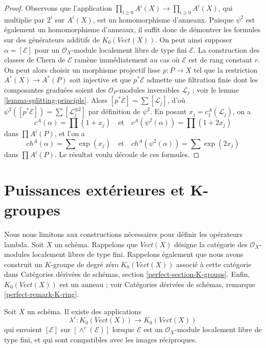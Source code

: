 \begin{proof}
Observons que l'application $\prod_{i \geq 0} A^i(X) \to \prod_{i \geq 0} A^i(X)$,
qui multiplie par $2^i$ sur $A^i(X)$, est un homomorphisme d'anneaux. Puisque $\psi^2$
est également un homomorphisme d'anneaux, il suffit donc de démontrer les formules
sur des générateurs additifs de $K_0(\textit{Vect}(X))$. On peut ainsi supposer $\alpha = [\mathcal{E}]$
pour un $\mathcal{O}_X$-module localement libre de type fini $\mathcal{E}$.
La construction des classes de Chern de $\mathcal{E}$ ramène immédiatement
au cas où $\mathcal{E}$ est de rang constant $r$.
On peut alors choisir un morphisme projectif lisse $p : P \to X$
tel que la restriction $A^*(X) \to A^*(P)$ soit injective
et que $p^*\mathcal{E}$ admette une filtration finie dont
les composantes graduées soient des $\mathcal{O}_P$-modules inversibles $\mathcal{L}_j$ ; voir
le lemme \ref{lemma-splitting-principle}. Alors
$[p^*\mathcal{E}] = \sum [\mathcal{L}_j]$, d'où
$\psi^2([p^*\mathcal{E}]) = \sum [\mathcal{L}_j^{\otimes 2}]$
par définition de $\psi^2$. En posant $x_j  = c^A_1(\mathcal{L}_j)$,
on a
$$
c^A(\alpha) = \prod (1 + x_j)
\quad\text{et}\quad
c^A(\psi^2(\alpha)) = \prod (1 + 2 x_j)
$$
dans $\prod A^i(P)$, et l'on a
$$
ch^A(\alpha) = \sum \exp(x_j)
\quad\text{et}\quad
ch^A(\psi^2(\alpha)) = \sum \exp(2 x_j)
$$
dans $\prod A^i(P)$. Le résultat voulu découle de ces formules.
\end{proof}







\section{Puissances extérieures et K-groupes}
\label{section-lambda-operations}

\noindent
Nous nous limitons aux constructions nécessaires pour définir les opérateurs lambda.
Soit $X$ un schéma. Rappelons que $\textit{Vect}(X)$ désigne
la catégorie des $\mathcal{O}_X$-modules localement libres de type fini.
Rappelons également que nous avons construit un $K$-groupe de degré zéro
$K_0(\textit{Vect}(X))$ associé à cette catégorie dans
Catégories dérivées de schémas, section \ref{perfect-section-K-groups}.
Enfin, $K_0(\textit{Vect}(X))$ est un anneau ; voir
Catégories dérivées de schémas, remarque \ref{perfect-remark-K-ring}.

\begin{lemma}
\label{lemma-lambda-operations}
Soit $X$ un schéma. Il existe des applications
$$
\lambda^r : K_0(\textit{Vect}(X)) \longrightarrow K_0(\textit{Vect}(X))
$$
qui envoient $[\mathcal{E}]$ sur $[\wedge^r(\mathcal{E})]$
lorsque $\mathcal{E}$ est un $\mathcal{O}_X$-module localement libre de type fini,
et qui sont compatibles avec les images réciproques.
\end{lemma}


